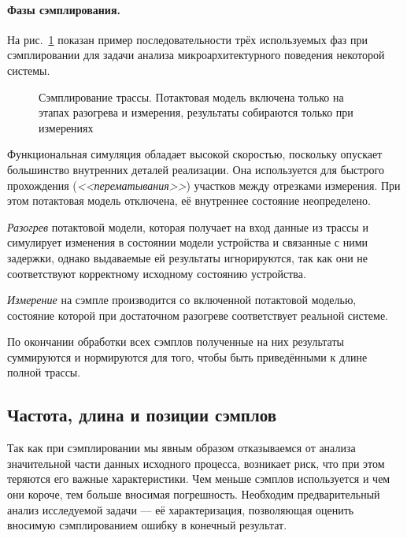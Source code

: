 \paragraph{Фазы сэмплирования.} На рис.~\ref{fig:trace-warmup} показан пример последовательности трёх используемых фаз при сэмплировании для задачи анализа микроархитектурного поведения некоторой системы.

\begin{figure}[htbp]
    \centering
    \caption[Сэмплирование трассы]{Сэмплирование трассы. Потактовая модель включена только на этапах разогрева и измерения, результаты собираются только при измерениях}
    \label{fig:trace-warmup}
\end{figure}


\begin{itemize*}
    \item Функциональная симуляция обладает высокой скоростью, поскольку опускает большинство внутренних деталей реализации. Она используется для быстрого прохождения (\textit{<<перематывания>>}) участков между отрезками измерения. При этом потактовая модель отключена, её внутреннее состояние неопределено.
    \item \textit{Разогрев} потактовой модели, которая получает на вход данные из трассы и симулирует изменения в состоянии модели устройства и связанные с ними задержки,  однако выдаваемые ей результаты игнорируются, так как они не соответствуют корректному исходному состоянию устройства. 
    \item \textit{Измерение} на сэмпле производится со включенной потактовой моделью, состояние которой при достаточном разогреве соответствует реальной системе.
    \item По окончании обработки всех сэмплов полученные на них результаты суммируются и нормируются для  того, чтобы быть приведёнными к длине полной трассы.
\end{itemize*}


\subsection{Частота, длина и позиции сэмплов}

Так как при сэмплировании мы явным образом отказываемся от анализа значительной части данных исходного процесса, возникает риск, что при этом теряются его важные характеристики. Чем меньше сэмплов используется и чем они короче, тем больше вносимая погрешность. Необходим предварительный анализ исследуемой задачи --- её характеризация, позволяющая оценить вносимую сэмплированием ошибку в конечный результат.

